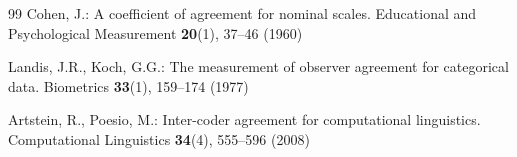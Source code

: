 ﻿\documentclass[runningheads]{llncs}
\begin{document}
\begin{thebibliography}{99}
Cohen, J.:
A coefficient of agreement for nominal scales.
Educational and Psychological Measurement \textbf{20}(1), 37--46 (1960)

Landis, J.R., Koch, G.G.:
The measurement of observer agreement for categorical data.
Biometrics \textbf{33}(1), 159--174 (1977)

Artstein, R., Poesio, M.:
Inter-coder agreement for computational linguistics.
Computational Linguistics \textbf{34}(4), 555--596 (2008)

\end{thebibliography}
\end{document}
